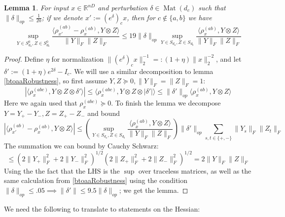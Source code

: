 \documentclass[aos]{imsart}
\newtheorem{lemma}[theorem]{Lemma}
\theoremstyle{definition}
\numberwithin{equation}{section}
\DeclareMathOperator{\Mat}{Mat}
\newcommand{\R}{{\mathbb{R}}}
\newcommand{\smallSym}{S}
\newcommand{\samp}{x}
\begin{document}
\begin{appendix}
\begin{lemma} \label{ctoabRobustness}
For input $\samp \in \R^{nD}$ and perturbation $\delta \in \Mat(d_{c})$ such that $\|\delta\|_{op} \leq \frac{1}{20}$; if we denote $\samp' := (e^{\delta})_{c} \samp$, then for $c \not\in \{a,b\}$ we have
\[ \sup_{Y \in \smallSym_{d_{a}}^{0}, Z \in \smallSym_{d_{b}}^{0}} \frac{\langle \rho_{\samp'}^{(ab)} - \rho_{\samp}^{(ab)}, Y \otimes Z \rangle}{\|Y\|_{F} \|Z\|_{F}} \leq 19 \|\delta\|_{op} \sup_{Y \in \smallSym_{d_{a}}, Z \in \smallSym_{d_{b}}} \frac{\langle \rho_{\samp}^{(ab)}, Y \otimes Z \rangle}{\|Y\|_{F} \|Z\|_{F}}        \]
\end{lemma}
\begin{proof}
Define $\eta$ for normalization $\|(e^{\delta})_{c} \samp\|_{2}^{-1} =: (1+\eta) \|\samp\|_{2}^{-2}$, and let $\delta' := (1+\eta) e^{2 \delta} - I_{c}$. We will use a similar decomposition to lemma \cref{btoaaRobustness}, so first assume $Y,Z \succeq 0, \|Y\|_{F} = \|Z\|_{F} = 1$:
\[ |\langle \rho_{\samp}^{(abc)}, Y \otimes Z \otimes \delta' \rangle| \leq \langle \rho_{\samp}^{(abc)}, Y \otimes Z \otimes |\delta'| \rangle \leq \|\delta'\|_{op} \langle \rho_{\samp}^{(ab)}, Y \otimes Z \rangle   \]
Here we again used that $\rho_{\samp}^{(abc)} \succeq 0$. %
To finish the lemma we decompose $Y = Y_{+} - Y_{-}, Z = Z_{+} - Z_{-}$ and bound
\[ |\langle \rho_{\samp'}^{(ab)} - \rho_{\samp}^{(ab)}, Y \otimes Z \rangle| \leq \left( \sup_{Y \in \smallSym_{d_{a}}, Z \in \smallSym_{d_{b}}} \frac{\langle \rho_{\samp}^{(ab)}, Y \otimes Z \rangle}{\|Y\|_{F} \|Z\|_{F}} \right) \|\delta'\|_{op} \sum_{s,t \in \{+,-\}} \|Y_{s}\|_{F} \|Z_{t}\|_{F}   \]
The summation we can bound by Cauchy Schwarz:
\[ \leq (2\|Y_{+}\|_{F}^{2} + 2\|Y_{-}\|_{F}^{2})^{1/2} (2\|Z_{+}\|_{F}^{2} + 2\|Z_{-}\|_{F}^{2})^{1/2} = 2 \|Y\|_{F} \|Z\|_{F}     \]
Using the the fact that the LHS is the $\sup$ over traceless matrices, as well as the same calculation from \cref{btoaaRobustness} using the condition $\|\delta\|_{op} \leq .05 \implies \|\delta'\| \leq 9.5 \|\delta\|_{op}$; we get the lemma.
\end{proof}

We need the following to translate to statements on the Hessian:


\end{appendix}
\end{document}
